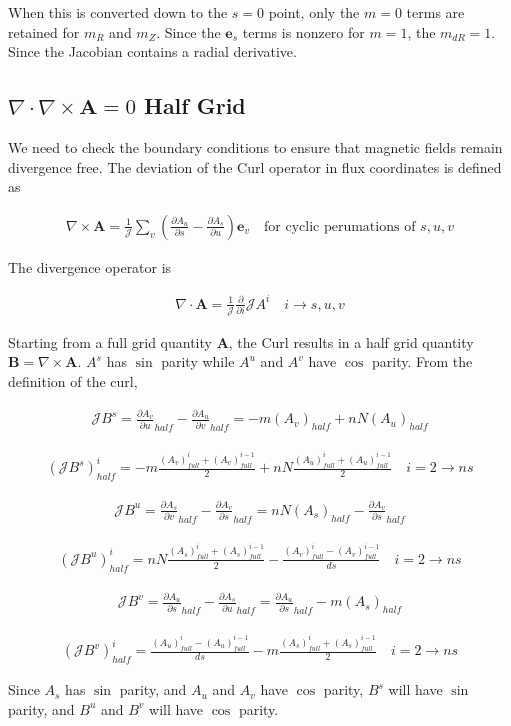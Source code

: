 \documentclass[11pt]{article}
\newcommand{\brackets}[1]{\left(#1\right)}
\renewcommand{\vec}[1]{\boldsymbol#1}
\newcommand{\co}[1]{\vec{e}_{#1}}
\newcommand{\equ}[2]{
	\begin{equation}
    \begin{split}
	#1
	\label{#2}
	\end{split}
	\end{equation}
}
\newcommand{\dotp}[2]{#1\cdot#2}
\newcommand{\crossp}[2]{#1\times#2}
\newcommand{\curl}[1]{\crossp{\nabla}{#1}}
\newcommand{\divergence}[1]{\dotp{\nabla}{#1}}
\begin{document}
When this is converted down to the $s=0$ point, only the $m=0$ terms are retained for $m_{R}$ and $m_{Z}$.
Since the $\co{s}$ terms is nonzero for $m=1$, the $m_{dR}=1$.
Since the Jacobian contains a radial derivative.

\subsection{$\divergence{\curl{\vec{A}}} = 0$ Half Grid}
\label{sec:div_half}
We need to check the boundary conditions to ensure that magnetic fields remain divergence free.
The deviation of the Curl operator in flux coordinates is defined as
\equ{
\curl{\vec{A}}=\frac{1}{\mathcal{J}}\sum_{v}\brackets{\frac{\partial A_{u}}{\partial s}-\frac{\partial A_{s}}{\partial u}}\co{v}\quad\textrm{for cyclic perumations of }s,u,v
}{equ:curl}
The divergence operator is
\equ{
\divergence{\vec{A}}=\frac{1}{\mathcal{J}}\frac{\partial}{\partial i}\mathcal{J}A^{i}\quad i\rightarrow s,u,v
}{equ:div}

Starting from a full grid quantity $\vec{A}$, the Curl results in a half grid quantity $\vec{B}=\curl{\vec{A}}$.
$A^{s}$ has $\sin$ parity while $A^{u}$ and $A^{v}$ have $\cos$ parity.
From the definition of the curl,
\equ{
\mathcal{J}B^{s}=\frac{\partial A_{v}}{\partial u}_{half} - \frac{\partial A_{u}}{\partial v}_{half}=-m\brackets{A_{v}}_{half}+nN\brackets{A_{u}}_{half}
}{equ:curl_b_s}
\equ{
\brackets{\mathcal{J}B^{s}}^{i}_{half}=-m\frac{\brackets{A_{v}}^{i}_{full}+\brackets{A_{v}}^{i-1}_{full}}{2}+nN\frac{\brackets{A_{u}}^{i}_{full}+\brackets{A_{u}}^{i-1}_{full}}{2}\quad i=2\rightarrow ns
}{equ:curl_b_s_i}
\equ{
\mathcal{J}B^{u}=\frac{\partial A_{s}}{\partial v}_{half}-\frac{\partial A_{v}}{\partial s}_{half}=nN\brackets{A_{s}}_{half}-\frac{\partial A_{v}}{\partial s}_{half}
}{equ:curl_b_u}
\equ{
\brackets{\mathcal{J}B^{u}}^{i}_{half}=
nN\frac{\brackets{A_{s}}^{i}_{full}+\brackets{A_{s}}^{i-1}_{full}}{2}-\frac{\brackets{A_{v}}^{i}_{full}-\brackets{A_{v}}^{i-1}_{full}}{ds}\quad i=2\rightarrow ns
}{equ:curl_b_u_i}
\equ{
\mathcal{J}B^{v}=\frac{\partial A_{u}}{\partial s}_{half}-\frac{\partial A_{s}}{\partial u}_{half}=\frac{\partial A_{u}}{\partial s}_{half}-m\brackets{A_{s}}_{half}
}{equ:curl_b_v}
\equ{
\brackets{\mathcal{J}B^{v}}^{i}_{half}=\frac{\brackets{A_{u}}^{i}_{full}-\brackets{A_{u}}^{i-1}_{full}}{ds}-m\frac{\brackets{A_{s}}^{i}_{full}+\brackets{A_{s}}^{i-1}_{full}}{2}\quad i=2\rightarrow ns
}{equ:curl_b_v_i}
Since $A_{s}$ has $\sin$ parity, and $A_{u}$ and $A_{v}$ have $\cos$ parity, $B^{s}$ will have $\sin$ parity, and $B^{u}$ and $B^{v}$ will have $\cos$ parity.
\end{document}
